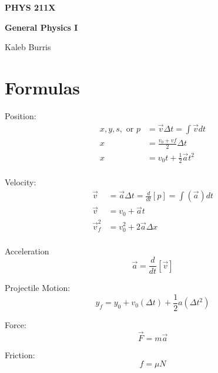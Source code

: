 \documentclass[12pt, letterpaper]{book}
\begin{document}
    \begin{titlepage}
        \Huge \textbf{PHYS 211X}

        \huge \textbf{General Physics I}

        \vfill

        \Large Kaleb Burris
    \end{titlepage}

    \section*{Formulas}
    \begin{multicols}{2}
        Position:
        \begin{align}
            x, y, s, \text{ or } p  & = \vec{v}\Delta t = \int\vec{v}dt         \\
                                 x  & = \frac{v_{0}+v{f}}{2}\Delta t            \\
                                 x  & = v_{0}t + \frac{1}{2}\vec{a}t^{2}        \\ 
        \end{align}

        Velocity:
        \begin{align}
            \vec{v}         & = \vec{a}\Delta t = \frac{d}{dt}[p] = \int(\vec{a})dt     \\
            \vec{v}         & = v_{0} + \vec{a}t                                        \\
            \vec{v}^{2}_{f} & = v^{2}_{0} + 2\vec{a}\Delta x                            \\
        \end{align}

        Acceleration
        \begin{equation}
            \vec{a} = \frac{d}{dt}[\vec{v}]
        \end{equation}

        Projectile Motion:
        \begin{equation}
            \label{eqn::yfinal}
            y_{f} = y_{0} + v_{0}(\Delta t) + \frac{1}{2}a(\Delta t^{2})
        \end{equation}

        Force:
        \begin{equation}
            \vec{F} = m\vec{a}
        \end{equation}

        Friction:
        \begin{equation}
            f = \mu N
        \end{equation}


\end{multicols}
\end{document}
